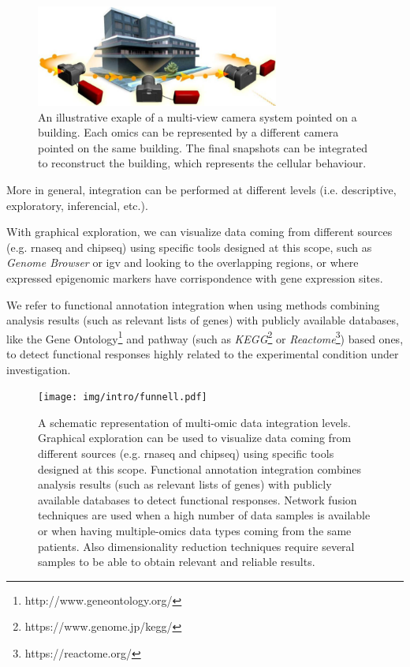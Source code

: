 \begin{figure}[h]
\centering
\includegraphics[width=8cm, keepaspectratio]{img/intro/cameras.png}
\caption[Integration cameras]{An illustrative exaple of a multi-view camera system pointed on a building.
Each omics can be represented by a different camera pointed on the same building. 
The final snapshots can be integrated to reconstruct the building, which represents the cellular behaviour.}
\label{fig:cameras}
\end{figure}

More in general, integration can be performed at different levels (i.e. descriptive, exploratory, inferencial, etc.).

With graphical exploration, we can visualize data coming from different sources (e.g. \gls{rnaseq} and \gls{chipseq}) using specific tools designed at this scope, such as \textit{Genome Browser} \cite{Karolchik2011} or \gls{igv} \cite{Robinson2011, Thorvaldsdottir2013} and looking to the overlapping regions, or where expressed epigenomic markers have corrispondence with gene expression sites.

We refer to functional annotation integration when using methods combining analysis results (such as relevant lists of genes) with publicly available databases,  like the Gene Ontology\footnote{http://www.geneontology.org/} and pathway (such as \textit{KEGG}\footnote{https://www.genome.jp/kegg/} or \textit{Reactome}\footnote{https://reactome.org/}) based ones, to detect functional responses highly related to the experimental condition under investigation.

\begin{figure}[h]
\centering
\texttt{[image: img/intro/funnell.pdf]}
\caption[Integration Funnell]{A schematic representation of multi-omic data integration levels.
Graphical exploration can be used to visualize data coming from different sources (e.g. \gls{rnaseq} and \gls{chipseq}) using specific tools designed at this scope.
Functional annotation integration combines analysis results (such as relevant lists of genes) with publicly available databases to detect functional responses.
Network fusion techniques are used when a high number of data samples is available or when having multiple-omics data types coming from the same patients.
Also dimensionality reduction techniques require several samples to be able to obtain relevant and reliable results.
}
\label{fig:funnell}
\end{figure}

